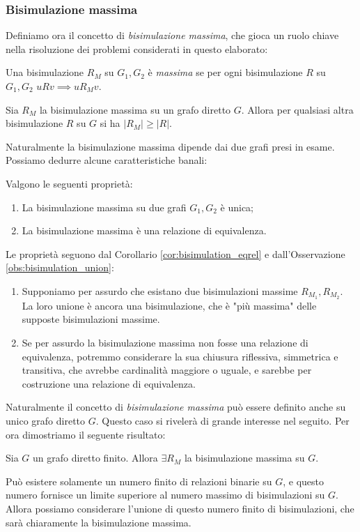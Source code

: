 \subsubsection{Bisimulazione massima}
\label{sec:bisi_max}
Definiamo ora il concetto di \emph{bisimulazione massima}, che gioca un ruolo chiave nella risoluzione dei problemi considerati in questo elaborato:
\begin{definition}
    Una bisimulazione $R_M$ su $G_1, G_2$ è \emph{massima} se per ogni bisimulazione $R$ su $G_1,G_2 \,\, u R v \implies u R_M v$.
\end{definition}
\begin{observation}
    Sia $R_M$ la bisimulazione massima su un grafo diretto $G$. Allora per qualsiasi altra bisimulazione $R$ su $G$ si ha $|R_M| \geq |R|$.
\end{observation}
Naturalmente la bisimulazione massima dipende dai due grafi presi in esame. Possiamo dedurre alcune caratteristiche banali:
\begin{proposition}
    Valgono le seguenti proprietà:
    \begin{enumerate}
        \item La bisimulazione massima su due grafi $G_1,G_2$ è unica;
        \item La bisimulazione massima è una relazione di equivalenza.
    \end{enumerate}
    \vspace*{-0.3cm}
    \label{prop:bisi_max_equi}
\end{proposition}
\begin{proof2}
    Le proprietà seguono dal Corollario \ref{cor:bisimulation_eqrel} e dall'Osservazione \ref{obs:bisimulation_union}:
    \begin{enumerate}
        \item Supponiamo per assurdo che esistano due bisimulazioni massime $R_{M_1}, R_{M_2}$. La loro unione è ancora una bisimulazione, che è "più massima" delle supposte bisimulazioni massime.
        \item Se per assurdo la bisimulazione massima non fosse una relazione di equivalenza, potremmo considerare la sua chiusura riflessiva, simmetrica e transitiva, che avrebbe cardinalità maggiore o uguale, e sarebbe per costruzione una relazione di equivalenza.
    \end{enumerate}
    \vspace*{-0.7cm}
\end{proof2}
Naturalmente il concetto di \emph{bisimulazione massima} può essere definito anche su unico grafo diretto $G$. Questo caso si rivelerà di grande interesse nel seguito. Per ora dimostriamo il seguente risultato:
\begin{theorem}
    Sia $G$ un grafo diretto finito. Allora $\exists R_M$ la bisimulazione massima su $G$.
\end{theorem}
\begin{proof2}
    Può esistere solamente un numero finito di relazioni binarie su $G$, e questo numero fornisce un limite superiore al numero massimo di bisimulazioni su $G$.
    Allora possiamo considerare l'unione di questo numero finito di bisimulazioni, che sarà chiaramente la bisimulazione massima.
\end{proof2}

